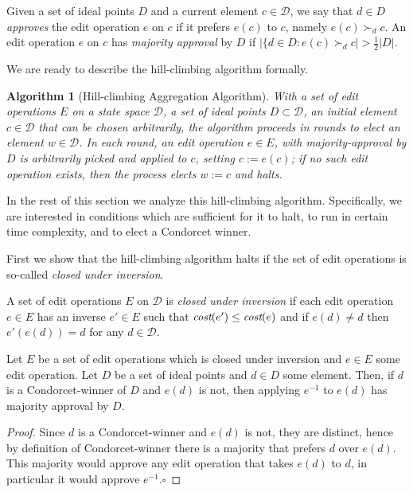 \documentclass{llncs}
\newtheorem{algorithm}{Algorithm}
\newcommand{\qqed}{\hfill$\square$}
\newcommand{\calD}{\mathcal{D}}
\newcommand{\prefers}[1]{\succ_{#1}}
\newcommand{\cost}{\emph{cost}}
\begin{document}
\begin{definition}
%
Given a set of ideal points $D$ and a current element $c \in \calD$,  we say that $d \in D$ \emph{approves} the edit operation $e$ on $c$ if it prefers $e(c)$ to $c$, namely $e(c) \prefers{d} c$.  An edit operation $e$ on $c$ has \emph{majority approval} by $D$ if $|\{d \in D : e(c) \prefers{d} c| > \frac{1}{2}{|D|}$.
%
\end{definition}

We are ready to describe the hill-climbing algorithm formally.

\begin{algorithm}[Hill-climbing Aggregation Algorithm]\label{algorithm:iva}
With a set of edit operations $E$ on a state space $\calD$, a set of ideal points $D \subset \calD$, an initial element $c \in \calD$ that can be chosen arbitrarily, the algorithm proceeds in rounds to elect an element $w \in \calD$.   In each round, an edit operation $e \in E$, with majority-approval by $D$ is arbitrarily picked and applied to $c$, setting $c := e(c)$;
if no such edit operation exists, then the process elects $w:=c$ and halts.
\end{algorithm}

In the rest of this section we analyze this hill-climbing algorithm. Specifically, we are interested in conditions which are sufficient for it to halt, to run in certain time complexity, and to elect a Condorcet winner.

First we show that the hill-climbing algorithm halts if the set of edit operations is so-called \emph{closed under inversion}.

\begin{definition}
%
A set of edit operations $E$ on $\calD$ is \emph{closed under inversion} if each edit operation $e \in E$ has an inverse $e' \in E$ such that $\cost(e') \leq \cost(e)$ and if $e(d) \ne d$ then $e'(e(d)) = d$ for any $d \in \calD$.
%
\end{definition}

\begin{lemma}\label{lemma:inverse}
Let $E$ be a set of edit operations which is closed under inversion and $e \in E$ some edit operation.
Let $D$ be a set of ideal points and $d \in D$ some element.
Then, if $d$ is a Condorcet-winner of $D$ and $e(d)$ is not,
then applying $e^{-1}$ to $e(d)$ has majority approval by $D$.
\end{lemma}

\begin{proof}
%
Since $d$ is a Condorcet-winner and $e(d)$ is not, they are distinct, hence by definition of Condorcet-winner there is a majority that prefers $d$ over $e(d)$.  This majority would approve any edit operation that takes $e(d)$ to $d$, in particular it would approve $e^{-1}$.\qqed
%
\end{proof}
\end{document}
